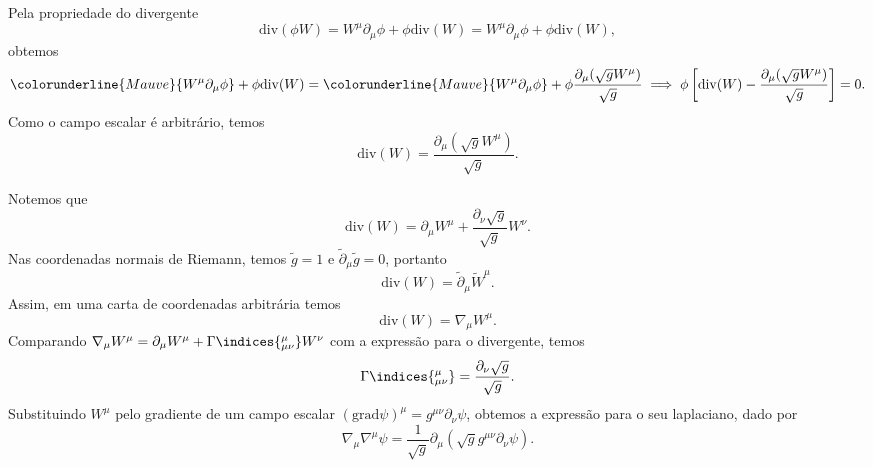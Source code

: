 Pela propriedade do divergente
\begin{equation*}
    \mathrm{div}(\phi W) = W^\mu\partial_\mu\phi + \phi\mathrm{div}(W) = W^\mu\partial_\mu\phi +\phi \mathrm{div}(W),
\end{equation*}
obtemos
\begin{equation*}
    \colorunderline{Mauve}{W^\mu \partial_\mu \phi} + \phi \mathrm{div}(W)= \colorunderline{Mauve}{W^\mu \partial_\mu \phi} + \phi \frac{\partial_\mu (\sqrt{g} W^\mu)}{\sqrt{g}} \implies \phi \left[ \mathrm{div}(W) - \frac{\partial_\mu(\sqrt{g}W^\mu)}{\sqrt{g}}\right] = 0.
\end{equation*}
Como o campo escalar é arbitrário, temos
\begin{equation*}
    \mathrm{div}(W) = \frac{\partial_\mu(\sqrt{g} W^\mu)}{\sqrt{g}}.
\end{equation*}

Notemos que
\begin{equation*}
    \mathrm{div}(W) = \partial_\mu W^\mu + \frac{\partial_\nu\sqrt{g}}{\sqrt{g}}W^\nu.
\end{equation*}
Nas coordenadas normais de Riemann, temos \(\tilde{g} = 1\) e \(\tilde{\partial}_\mu \tilde{g} = 0\), portanto
\begin{equation*}
    \mathrm{div}(W) = \tilde{\partial}_\mu\tilde{W}^\mu.
\end{equation*}
Assim, em uma carta de coordenadas arbitrária temos
\begin{equation*}
    \mathrm{div}(W) = \nabla_\mu W^\mu.
\end{equation*}
Comparando \(\nabla_\mu W^\mu = \partial_\mu W^\mu + \Gamma\indices{^\mu_{\mu\nu}}W^\nu\) com a expressão para o divergente, temos
\begin{equation*}
    \Gamma\indices{^\mu_{\mu\nu}} = \frac{\partial_\nu \sqrt{g}}{\sqrt{g}}.
\end{equation*}
Substituindo \(W^\mu\) pelo gradiente de um campo escalar \((\mathrm{grad} \psi)^\mu = g^{\mu\nu}\partial_\nu \psi\), obtemos a expressão para o seu laplaciano, dado por
\begin{equation*}
    \nabla_\mu \nabla^\mu\psi = \frac{1}{\sqrt{g}}\partial_\mu\left(\sqrt{g} g^{\mu\nu}\partial_\nu \psi\right).
\end{equation*}

